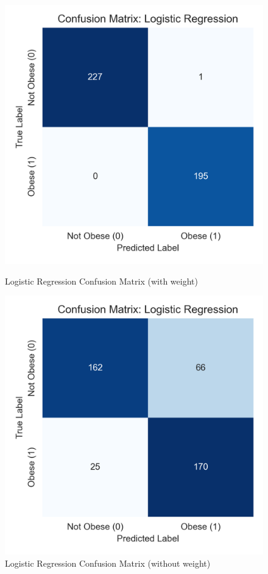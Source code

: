 \documentclass[a4paper,12pt]{article}
\begin{document}
\begin{figure}[H]
\centering
\begin{minipage}{0.35\textwidth}
    \centering
    \includegraphics[width=\linewidth]{logistic_regression_confusion.png}
    \caption{Logistic Regression Confusion Matrix (with weight)}
\end{minipage}
\hspace{0.04\textwidth}
\begin{minipage}{0.35\textwidth}
    \centering
    \includegraphics[width=\linewidth]{logistic_regression_confusion_withoutWeight.png}
    \caption{Logistic Regression Confusion Matrix (without weight)}
\end{minipage}
\label{fig:logreg_weight_comparison}
\end{figure}
\end{document}
